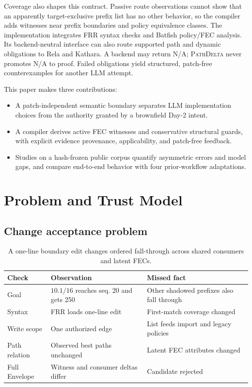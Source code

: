 \documentclass[conference]{IEEEtran}
\newcommand{\system}{\textsc{PathDelta}\xspace}
\newcommand{\na}{\textsc{N/A}\xspace}
\begin{document}
Coverage also shapes this contract.  Passive route observations cannot show that an
apparently target-exclusive prefix list has no other behavior, so the compiler
adds witnesses near prefix boundaries and policy equivalence classes.  The
implementation integrates FRR syntax checks and Batfish policy/FEC analysis.
Its backend-neutral interface can also route supported path and dynamic
obligations to Rela and Kathara.  A
backend may return \na; \system never promotes \na to proof.  Failed obligations
yield structured, patch-free counterexamples for another LLM attempt.

This paper makes three contributions:

\begin{itemize}
  \item A patch-independent semantic boundary separates LLM implementation
  choices from the authority granted by a brownfield Day-2 intent.
  \item A compiler derives active FEC witnesses and conservative structural
  guards, with explicit evidence provenance, applicability, and patch-free
  feedback.
  \item Studies on a hash-frozen public corpus quantify asymmetric errors and model
  gaps, and compare end-to-end behavior with four prior-workflow adaptations.
\end{itemize}

\section{Problem and Trust Model}

\subsection{Change acceptance problem}

\begin{table}[t]
\caption{A one-line boundary edit changes ordered fall-through across shared
consumers and latent FECs.}
\label{tab:motivation}
\centering
\footnotesize
\setlength{\tabcolsep}{3.0pt}
\begin{tabular}{>{\raggedright\arraybackslash}p{}
                >{\raggedright\arraybackslash}p{}
                >{\raggedright\arraybackslash}p{}}
\toprule
Check & Observation & Missed fact \\
\midrule
Goal & $10.1/16$ reaches seq. 20 and gets 250 & Other shadowed prefixes also fall through \\
Syntax & FRR loads one-line edit & First-match coverage changed \\
Write scope & One authorized edge & List feeds import and legacy policies \\
Path relation & Observed best paths unchanged & Latent FEC attributes changed \\
Full Envelope & Witness and consumer deltas differ & Candidate rejected \\
\bottomrule
\end{tabular}
\end{table}
\end{document}
